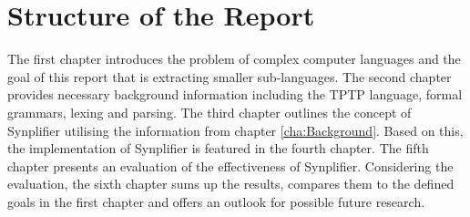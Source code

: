 \section{Structure of the Report}\label{sec:IntroductionStructure}

The first chapter introduces the problem of complex computer languages and the goal of this report that is extracting smaller sub-languages.
The second chapter provides necessary background information including the \ac{TPTP} language, formal grammars, lexing and parsing. The third chapter outlines the concept of \ac{Synplifier} utilising the information from chapter \ref{cha:Background}.
Based on this, the implementation of \ac{Synplifier} is featured in the fourth chapter.
The fifth chapter presents an evaluation of the effectiveness of \ac{Synplifier}. Considering the evaluation, the sixth chapter sums up the results, compares them to the defined goals in the first chapter and offers an outlook for possible future research.